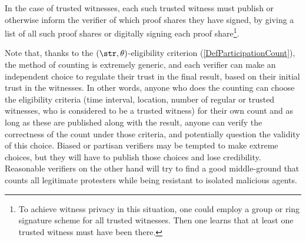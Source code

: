 In the case of trusted witnesses, each such trusted witness must
publish or otherwise inform the 
verifier of which proof shares they have signed, \eg by giving a list 
of all such proof shares or digitally signing each proof share\footnote{
 To achieve witness privacy in this situation, one could employ a group or 
 ring signature scheme for all trusted witnesses.
 Then one learns that at least one trusted witness must have been there.
}.

Note that, thanks to the \((\str,\theta)\)-eligibility criterion (\cref{DefParticipationCount}), the method of counting is extremely generic, and each verifier can make an independent choice to regulate their trust in the final result, based on their initial trust in the witnesses. In other words, anyone who does the counting can choose the eligibility
criteria (time interval, location, number of regular or trusted
witnesses, who is considered to be a trusted witness) for their own count
and as long as these are published along with the result, anyone can
verify the correctness of the count under those criteria, and potentially question the validity of this choice. Biased or partisan verifiers may be tempted to make extreme choices, but they will have to publish those choices and lose credibility. Reasonable verifiers on the other hand will try to find a good middle-ground that counts all legitimate protesters while being resistant to isolated malicious agents.

